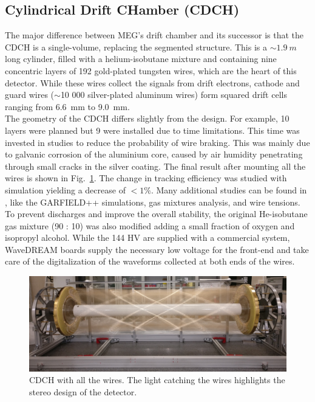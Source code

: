 \begin{refsection}
    \subsection{Cylindrical Drift CHamber (CDCH)}
        The major difference between MEG's drift chamber and its successor is that the CDCH is a single-volume, replacing the segmented structure.
        This is a $\sim\SI{1.9}{m}$ long cylinder, filled with a helium-isobutane mixture and containing nine concentric layers of 192 gold-plated tungsten wires, which are the heart of this detector.
        While these wires collect the signals from drift electrons, cathode and guard wires ($\sim$10 000 silver-plated aluminum wires) form squared drift cells ranging from \SI{6.6}{mm} to \SI{9.0}{mm}.\\
        The geometry of the CDCH differs slightly from the design.
        For example, 10 layers were planned but 9 were installed due to time limitations. This time was invested in studies to reduce the probability of wire braking.
        This was mainly due to galvanic corrosion of the aluminium core, caused by air humidity penetrating through small cracks in the silver coating.
        The final result after mounting all the wires is shown in Fig.~\ref{fig:MEGII:CDCH}.
        The change in tracking efficiency was studied with simulation yielding a decrease of $< 1\%$.
        Many additional studies can be found in \cite{MEG_II:detector}, like the GARFIELD++ simulations, gas mixtures analysis, and wire tensions.
        To prevent discharges and improve the overall stability, the original He-isobutane gas mixture (90 : 10) was also modified adding a small fraction of oxygen and isopropyl alcohol.
        While the 144 HV are supplied with a commercial system, WaveDREAM boards supply the necessary low voltage for the front-end and take care of the digitalization of the waveforms collected at both ends of the wires.

        \begin{figure}
            \centering
            \includegraphics[width = \textwidth]{Figures/MEG/CDCH.png}
            \caption[CDCH: picture]{CDCH with all the wires. The light catching the wires highlights the stereo design of the detector.}
            \label{fig:MEGII:CDCH}
        \end{figure}


\end{refsection}

